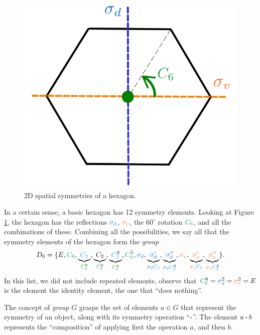 \begin{figure}[H]
\centering
\includegraphics[width=0.4\linewidth]{fig/hexagon.png}
\caption{2D spatial symmetries of a hexagon.}
\label{fig:hexagon}
\end{figure}

\begin{example} \label{ex:symm_elems_hexagon_D6_example}
In a certain sense, a basic hexagon has 12 symmetry elements. Looking at Figure \ref{fig:hexagon}, the hexagon has the reflections $\sd$, $\sv$, the $60^\circ$ rotation $\Cs$, and all the combinations of these. Combining all the possibilities, we say all that the symmetry elements of the hexagon form the \textit{group}
\begin{equation} \label{eq:all_D6_elements}
D_6 = \{E, \Cs, \underbrace{\Ct}_{\Csn{2}}, \underbrace{C_2}_{\Csn{3}}, \underbrace{\Ctn{2}}_{\Csn{4}}, \Csn{5}, \sd, \underbrace{\sdp}_{\sd \Ct}, \underbrace{\sdpp}_{\sd \Ctn{2}}, \sv, \underbrace{\svp}_{\sv \Ct}, \underbrace{\svpp}_{\sv \Ctn{2}} \}.
\end{equation}
In this list, we did not include repeated elements, observe that $\Csn{6} = \sdn{2} = \svn{2} = E$ is the element the identity element, the one that ``does nothing''.
\end{example}


The concept of \textit{group} $G$ grasps the set of elements $a \in G$ that represent the symmetry of an object, along with its symmetry operation ``$\vdot$''. The element $a \vdot b$ represents the ``composition'' of applying first the operation $a$, and then $b$.

